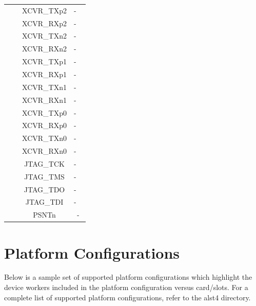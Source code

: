 \documentclass{article}
\begin{document}
\begin{longtable}[l]{|c|c|c|c|}
  & & XCVR\_TXp2 & - \
  \\\cline{3-4}
  & & XCVR\_RXp2 & - \
  \\\cline{3-4}
  & & XCVR\_TXn2 & - \
  \\\cline{3-4}
  & & XCVR\_RXn2 & - \
  \\\cline{3-4}
  & & XCVR\_TXp1 & - \
  \\\cline{3-4}
  & & XCVR\_RXp1 & - \
  \\\cline{3-4}
  & & XCVR\_TXn1 & - \
  \\\cline{3-4}
  & & XCVR\_RXn1 & - \
  \\\cline{3-4}
  & & XCVR\_TXp0 & - \
  \\\cline{3-4}
  & & XCVR\_RXp0 & - \
  \\\cline{3-4}
  & & XCVR\_TXn0 & - \
  \\\cline{3-4}
  & & XCVR\_RXn0 & - \
  \\\cline{3-4}
  & & JTAG\_TCK & - \
  \\\cline{3-4}
  & & JTAG\_TMS & - \
  \\\cline{3-4}
  & & JTAG\_TDO & - \
  \\\cline{3-4}
  & & JTAG\_TDI & - \
  \\\cline{3-4}
  & & PSNTn & - \\
	\hline
\end{longtable}
\newpage

\section*{Platform Configurations}
Below is a sample set of supported platform configurations which  highlight the device workers included in the platform configuration versus card/slots. For a complete list of supported platform configurations, refer to the alst4 directory. \\
\end{document}
